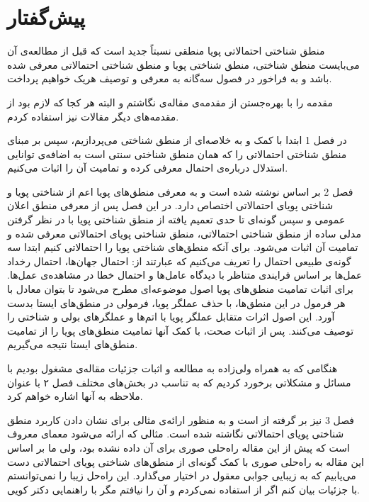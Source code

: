 \chapter*{پیش‌گفتار}

منطق شناختی احتمالاتی پویا منطقی نسبتاً جدید است که قبل از مطالعه‌ی آن می‌بایست منطق شناختی، منطق شناختی پویا و منطق شناختی احتمالاتی معرفی شده باشد و به فراخور در فصول سه‌گانه‌ به معرفی و توصیف هریک خواهیم پرداخت. 

مقدمه را با بهره‌جستن از مقدمه‌ی مقاله‌ی \citep{Kooi2003} نگاشتم و البته هر کجا که لازم بود از مقدمه‌های دیگر مقالات نیز استفاده کردم.

در فصل 1 ابتدا با کمک \citep{DELDitmarsch2007} و \citep{Sack2007} به خلاصه‌ای از منطق شناختی می‌پردازیم، سپس بر مبنای \citep{Fagin1994} منطق شناختی احتمالاتی را که همان منطق شناختی سنتی است به اضافه‌ی توانایی استدلال درباره‌ی احتمال معرفی کرده و تمامیت آن را اثبات می‌کنیم. 

فصل 2 بر اساس \citep{Benthem2009} نوشته شده است و به معرفی منطق‌های پویا اعم از شناختی پویا و شناختی پویای احتمالاتی اختصاص دارد. در این فصل پس از معرفی منطق اعلان عمومی و سپس گونه‌ای تا حدی تعمیم یافته از منطق شناختی پویا با در نظر گرفتن مدلی ساده‌ از منطق‌ شناختی احتمالاتی، منطق شناختی پویای احتمالاتی معرفی شده و تمامیت آن اثبات می‌شود. برای آنکه منطق‌های شناختی پویا را احتمالاتی کنیم ابتدا سه گونه‌ی طبیعی احتمال را تعریف می‌کنیم که عبارتند از: احتمال {\prior} جهان‌ها، احتمال رخداد عمل‌ها بر اساس فرایندی متناظر با دیدگاه عامل‌ها و احتمال خطا در مشاهده‌ی عمل‌ها. برای اثبات تمامیت منطق‌های پویا اصول موضوعه‌ای مطرح می‌شود تا بتوان معادل با هر فرمول در این منطق‌ها، با حذف عملگر پویا، فرمولی در منطق‌های ایستا بدست آورد. این اصول اثرات متقابل عملگر پویا با اتم‌ها و عملگرهای بولی و شناختی را توصیف می‌کنند. پس از اثبات صحت، با کمک آنها تمامیت منطق‌های پویا را از تمامیت منطق‌های ایستا نتیجه می‌گیریم.

هنگامی که به همراه ولی‌زاده به مطالعه و اثبات جزئیات مقاله‌ی \citep{Benthem2009} مشغول بودیم با مسائل و مشکلاتی برخورد کردیم که به تناسب در بخش‌های مختلف فصل ۲ با عنوان ملاحظه به آنها اشاره خواهم کرد.

فصل 3 نیز بر گرفته از \citep{Kooi2003} است و به منظور ارائه‌ی مثالی برای نشان دادن کاربرد منطق شناختی پویای احتمالاتی نگاشته شده است. مثالی که ارائه می‌شود معمای معروف  است که پیش از این مقاله راه‌حلی صوری برای آن داده نشده بود، ولی ما بر اساس این مقاله به راه‌حلی صوری با کمک گونه‌ای از منطق‌های شناختی پویای احتمالاتی دست می‌یابیم که به زیبایی جوابی معقول در اختیار می‌گذارد. این راه‌حل زیبا را نمی‌توانستم با جزئیات بیان کنم اگر از \citep{Kooithesise2003} استفاده نمی‌کردم و آن را نیافتم مگر با راهنمایی دکتر کویی.
